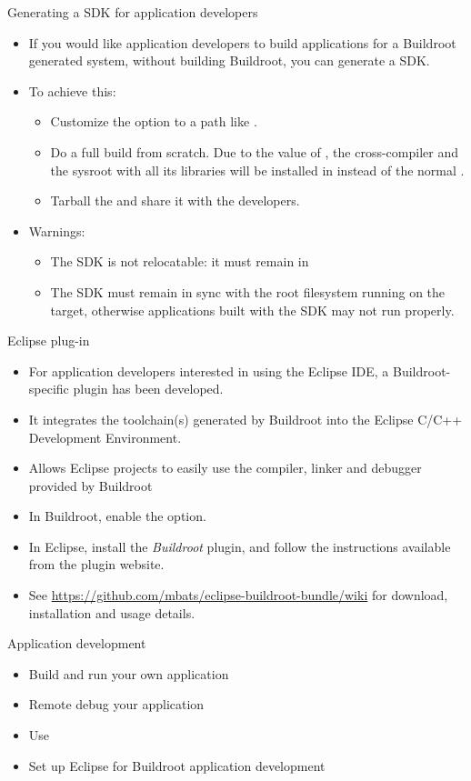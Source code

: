 \begin{frame}{Generating a SDK for application developers}
  \begin{itemize}
  \item If you would like application developers to build applications
    for a Buildroot generated system, without building Buildroot, you
    can generate a SDK.
  \item To achieve this:
    \begin{itemize}
    \item Customize the  option to a path like
      .
    \item Do a full build from scratch. Due to the value of
      , the cross-compiler and the sysroot with all
      its libraries will be installed in 
      instead of the normal .
    \item Tarball the  and share it with the
      developers.
    \end{itemize}
  \item Warnings:
    \begin{itemize}
    \item The SDK is not relocatable: it must remain in
    \item The SDK must remain in sync with the root filesystem running
      on the target, otherwise applications built with the SDK may not
      run properly.
    \end{itemize}
  \end{itemize}
\end{frame}

\begin{frame}{Eclipse plug-in}
  \begin{itemize}
  \item For application developers interested in using the Eclipse
    IDE, a Buildroot-specific plugin has been developed.
  \item It integrates the toolchain(s) generated by Buildroot into the
    Eclipse C/C++ Development Environment.
  \item Allows Eclipse projects to easily use the compiler, linker and
    debugger provided by Buildroot
  \item In Buildroot, enable the  option.
  \item In Eclipse, install the {\em Buildroot} plugin, and follow the
    instructions available from the plugin website.
  \item See
    \url{https://github.com/mbats/eclipse-buildroot-bundle/wiki} for
    download, installation and usage details.
  \end{itemize}
\end{frame}

\setuplabframe
{Application development}
{
  \begin{itemize}
  \item Build and run your own application
  \item Remote debug your application
  \item Use 
  \item Set up Eclipse for Buildroot application development
  \end{itemize}
}

